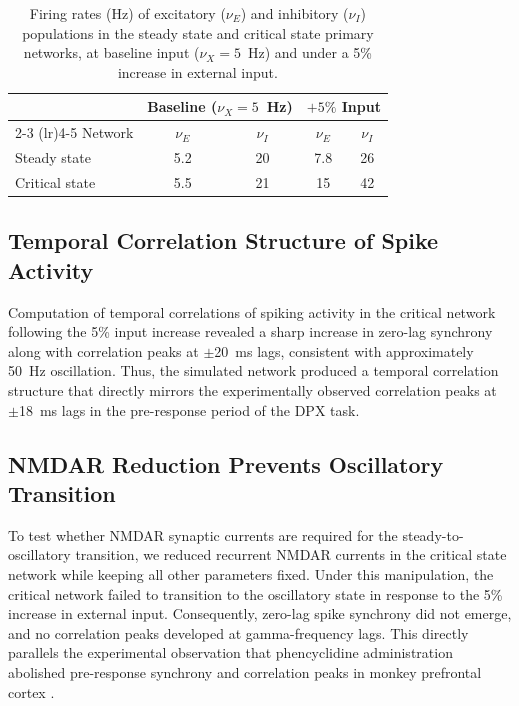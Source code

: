 \documentclass[10pt]{article}
\begin{document}
\begin{table}[htbp]
\centering
\caption{Firing rates (Hz) of excitatory ($\nu_E$) and inhibitory ($\nu_I$)
populations in the steady state and critical state primary networks, at
baseline input ($\nu_X = 5$~Hz) and under a 5\% increase in external input.}
\label{tab:firing_rates}
\begin{tabular}{lcccc}
\toprule
& \multicolumn{2}{c}{Baseline ($\nu_X = 5$~Hz)} & \multicolumn{2}{c}{$+5\%$ Input} \\
\cmidrule(lr){2-3} \cmidrule(lr){4-5}
Network & $\nu_E$ & $\nu_I$ & $\nu_E$ & $\nu_I$ \\
\midrule
Steady state & 5.2 & 20 & 7.8 & 26 \\
Critical state & 5.5 & 21 & 15 & 42 \\
\bottomrule
\end{tabular}
\end{table}

\subsection{Temporal Correlation Structure of Spike Activity}

Computation of temporal correlations of spiking activity in the critical
network following the 5\% input increase revealed a sharp increase in
zero-lag synchrony along with correlation peaks at $\pm$20~ms lags, consistent
with approximately 50~Hz oscillation. Thus, the simulated network produced a
temporal correlation structure that directly mirrors the experimentally
observed correlation peaks at $\pm$18~ms lags in the pre-response period of
the DPX task.

\subsection{NMDAR Reduction Prevents Oscillatory Transition}

To test whether NMDAR synaptic currents are required for the steady-to-
oscillatory transition, we reduced recurrent NMDAR currents in the critical
state network while keeping all other parameters fixed. Under this
manipulation, the critical network failed to transition to the oscillatory
state in response to the 5\% increase in external input. Consequently,
zero-lag spike synchrony did not emerge, and no correlation peaks developed
at gamma-frequency lags. This directly parallels the experimental observation
that phencyclidine administration abolished pre-response synchrony and
correlation peaks in monkey prefrontal cortex \citep{zick2018blocking}.
\end{document}
